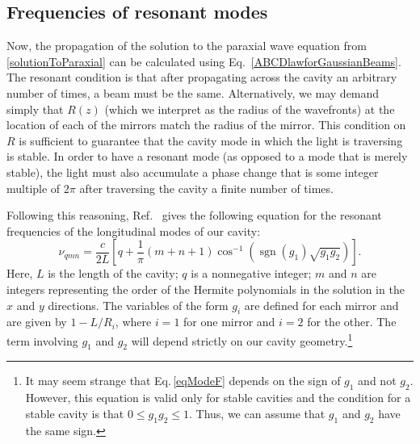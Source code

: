
\subsection{Frequencies of resonant modes}
Now, the propagation of the solution to the paraxial wave equation from \ref{solutionToParaxial} can be calculated using Eq.\ \ref{ABCDlawforGaussianBeams}. The resonant condition is that after propagating across the cavity an arbitrary number of times, a beam must be the same\cite{lasersMilonniEberly}.
Alternatively, we may demand simply that $R(z)$ (which we interpret as the radius of the wavefronts) at the location of each of the mirrors match the radius of the mirror. This condition on $R$ is sufficient to guarantee that the cavity mode in which the light is traversing is stable. In order to have a resonant mode (as opposed to a mode that is merely stable), the light must also accumulate a phase change that is some integer multiple of $2\pi$ after traversing the cavity a finite number of times.

Following this reasoning, Ref.\ \cite{lasersMilonniEberly} gives the following equation for the resonant frequencies of the longitudinal modes of our cavity:
\begin{equation} \label{eqModeF}
\nu_{qmn}=\frac{c}{2L}\left[q + \frac{1}{\pi}(m+n+1)\cos^{-1}(\operatorname{sgn}(g_1)\sqrt{g_1 g_2})\right]. 
\end{equation}
Here, $L$ is the length of the cavity; $q$ is a nonnegative integer; $m$ and $n$ are integers representing the order of the Hermite polynomials in the solution in the $x$ and $y$ directions. The variables of the form $g_i$ are defined for each mirror and are given by $1-L/R_i$, where $i=1$ for one mirror and $i=2$ for the other. The term involving $g_1$ and $g_2$ will depend strictly on our cavity geometry.\footnote{It may seem strange that Eq.\,\ref{eqModeF} depends on the sign of $g_1$ and not $g_2$. However, this equation is valid only for stable cavities and the condition for a stable cavity is that $0\leq g_1 g_2 \leq 1$. Thus, we can assume that $g_1$ and $g_2$ have the same sign.}

